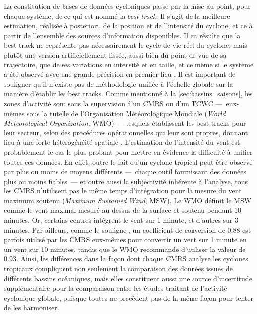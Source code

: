 \documentclass[../main.tex]{subfiles}
\begin{document}
La constitution de bases de données cycloniques passe par la mise au point, pour chaque système, de ce qui est nommé la \textit{best track}. Il s'agit de la
meilleure estimation, réalisée à posteriori, de la position et de l'intensité du cyclone, et ce à partir de l'ensemble des sources d'information disponibles. Il
en résulte que la best track ne représente pas nécessairement le cycle de vie réel du cyclone, mais plutôt une version artificiellement lissée, aussi bien du
point de vue de sa trajectoire, que de ses variations en intensité et en taille, et ce même si le système a été observé avec une grande précision en premier
lieu \parencite{landsea_atlantic_2013}. Il est important de souligner qu'il n'existe pas de méthodologie unifiée à l'échelle globale sur la manière d'établir
les best tracks. Comme mentionné à la \cref{sec:bassins_saisons}, les zones d'activité sont sous la supervision d'un CMRS ou d'un TCWC ---~eux-mêmes sous la
tutelle de l'Organisation Météorologique Mondiale (\textit{World Meteorological Organization}, WMO)~--- lesquels établissent les best tracks pour leur secteur,
selon des procédures opérationnelles qui leur sont propres, donnant lieu à une forte hétérogénéité spatiale \parencite{schreck_impact_2014}. L'estimation de
l'intensité du vent est probablement le cas le plus probant pour mettre en évidence la difficulté à unifier toutes ces données. En effet, outre le fait qu'un
cyclone tropical peut être observé par plus ou moins de moyens différents ---~chaque outil fournissant des données plus ou moins fiables~--- et outre aussi la
subjectivité inhérente à l'analyse, tous les CMRS n'utilisent pas le même temps d'intégration pour la mesure du vent maximum soutenu (\textit{Maximum Sustained
Wind}, MSW). Le WMO définit le MSW comme le vent maximal mesuré  au dessus de la surface et soutenu pendant \num{10} minutes. Or, certains centres
intègrent le vent sur \num{1} minute, et d'autres sur \num{3} minutes. Par ailleurs, comme le souligne \textcite{knapp_international_2010}, un coefficient de
conversion de \num{0.88} est parfois utilisé par les CMRS eux-mêmes pour convertir un vent sur \num{1} minute en un vent sur \num{10} minutes, tandis que le WMO
recommande d'utiliser la valeur de \num{0.93}. Ainsi, les différences dans la façon dont chaque CMRS analyse les cyclones tropicaux compliquent non seulement la
comparaison des données issues de différents bassins océaniques, mais elles constituent aussi une source d'incertitude supplémentaire pour la comparaison entre
les études traitant de l'activité cyclonique globale, puisque toutes ne procèdent pas de la même façon pour tenter de les harmoniser.
\end{document}
